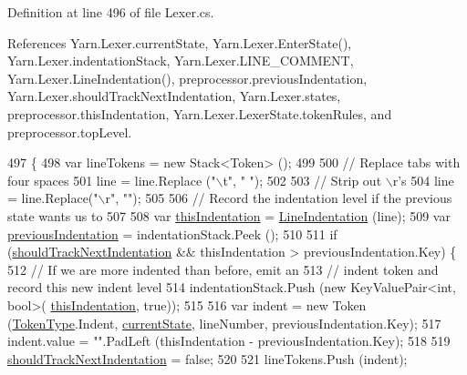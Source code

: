 Definition at line 496 of file Lexer.\-cs.



References Yarn.\-Lexer.\-current\-State, Yarn.\-Lexer.\-Enter\-State(), Yarn.\-Lexer.\-indentation\-Stack, Yarn.\-Lexer.\-L\-I\-N\-E\-\_\-\-C\-O\-M\-M\-E\-N\-T, Yarn.\-Lexer.\-Line\-Indentation(), preprocessor.\-previous\-Indentation, Yarn.\-Lexer.\-should\-Track\-Next\-Indentation, Yarn.\-Lexer.\-states, preprocessor.\-this\-Indentation, Yarn.\-Lexer.\-Lexer\-State.\-token\-Rules, and preprocessor.\-top\-Level.


\begin{DoxyCode}
497         \{
498             var lineTokens = \textcolor{keyword}{new} Stack<Token> ();
499 
500             \textcolor{comment}{// Replace tabs with four spaces}
501             line = line.Replace (\textcolor{stringliteral}{"\(\backslash\)t"}, \textcolor{stringliteral}{"    "});
502 
503             \textcolor{comment}{// Strip out \(\backslash\)r's}
504             line = line.Replace(\textcolor{stringliteral}{"\(\backslash\)r"}, \textcolor{stringliteral}{""});
505 
506             \textcolor{comment}{// Record the indentation level if the previous state wants us to}
507 
508             var \hyperlink{a00336_a0e59365a4aa5811f6495b92a51e23573}{thisIndentation} = \hyperlink{a00121_a4079b10b099e5d85f5482f9e7eac4179}{LineIndentation} (line);
509             var \hyperlink{a00336_ade44b858578c3eab7b6f90030a0e3ea1}{previousIndentation} = indentationStack.Peek ();
510 
511             \textcolor{keywordflow}{if} (\hyperlink{a00121_ac670aac2245cbd4694dfbd5b69313218}{shouldTrackNextIndentation} && thisIndentation > 
      previousIndentation.Key) \{
512                 \textcolor{comment}{// If we are more indented than before, emit an}
513                 \textcolor{comment}{// indent token and record this new indent level}
514                 indentationStack.Push (\textcolor{keyword}{new} KeyValuePair<int, bool>(
      \hyperlink{a00336_a0e59365a4aa5811f6495b92a51e23573}{thisIndentation}, \textcolor{keyword}{true}));
515 
516                 var indent = \textcolor{keyword}{new} Token (\hyperlink{a00045_a301aa7c866593a5b625a8fc158bbeace}{TokenType}.Indent, \hyperlink{a00121_ac90b7dce8103425a148f9e8588f14137}{currentState}, lineNumber, 
      previousIndentation.Key);
517                 indent.value = \textcolor{stringliteral}{""}.PadLeft (thisIndentation - previousIndentation.Key);
518 
519                 \hyperlink{a00121_ac670aac2245cbd4694dfbd5b69313218}{shouldTrackNextIndentation} = \textcolor{keyword}{false};
520 
521                 lineTokens.Push (indent);

\end{DoxyCode}
